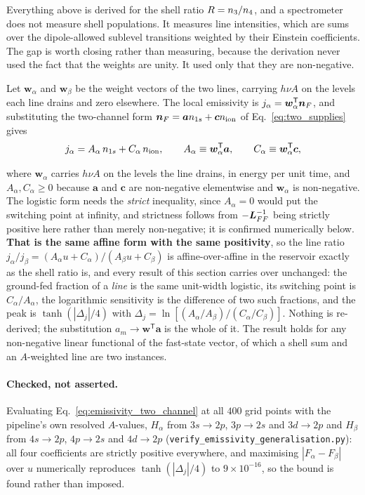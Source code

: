 Everything above is derived for the shell ratio $R = n_3/n_4$, and a
spectrometer does not measure shell populations. It measures line intensities,
which are sums over the dipole-allowed sublevel transitions weighted by their
Einstein coefficients. The gap is worth closing rather than measuring, because
the derivation never used the fact that the weights are unity. It used only
that they are non-negative.

Let $\bm{w}_\alpha$ and $\bm{w}_\beta$ be the weight vectors of the two lines,
carrying $h\nu A$ on the levels each line drains and zero elsewhere. The local
emissivity is $j_\alpha = \bm{w}_\alpha^{\mathsf T}\bm{n}_{F}$, and substituting the
two-channel form $\bm{n}_{F} = \bm{a}n_{1s} + \bm{c}n_{\mathrm{ion}}$ of
Eq.~\eqref{eq:two_supplies} gives
\begin{equation}
  j_\alpha = A_\alpha\,n_{1s} + C_\alpha\,n_{\mathrm{ion}} ,
  \qquad
  A_\alpha \equiv \bm{w}_\alpha^{\mathsf T}\bm{a},
  \qquad
  C_\alpha \equiv \bm{w}_\alpha^{\mathsf T}\bm{c} ,
  \label{eq:emissivity_two_channel}
\end{equation}

\noindent where $\bm{w}_\alpha$ carries $h\nu A$ on the levels the line drains,
in energy per unit time, and $A_\alpha, C_\alpha \ge 0$ because $\bm{a}$ and
$\bm{c}$ are non-negative elementwise and $\bm{w}_\alpha$ is non-negative. The
logistic form needs the \emph{strict} inequality, since $A_\alpha = 0$ would put
the switching point at infinity, and strictness follows from
$-\bm{L}_{FF}^{-1}$ being strictly positive here rather than merely
non-negative; it is confirmed numerically below.
\textbf{That is the same affine form with the same positivity},
so the line ratio
$j_\alpha/j_\beta = (A_\alpha u + C_\alpha)/(A_\beta u + C_\beta)$ is
affine-over-affine in the reservoir exactly as the shell ratio is, and every
result of this section carries over unchanged: the ground-fed fraction of a
\emph{line} is the same unit-width logistic, its switching point is
$C_\alpha/A_\alpha$, the logarithmic sensitivity is the difference of two such
fractions, and the peak is $\tanh(|\Delta_j|/4)$ with
$\Delta_j = \ln[(A_\alpha/A_\beta)/(C_\alpha/C_\beta)]$. Nothing is re-derived;
the substitution $a_m \to \bm{w}^{\mathsf T}\bm{a}$ is the whole of it. The
result holds for any non-negative linear functional of the fast-state vector,
of which a shell sum and an $A$-weighted line are two instances.

\paragraph{Checked, not asserted.} Evaluating
Eq.~\eqref{eq:emissivity_two_channel} at all $400$ grid points with the
pipeline's own resolved $A$-values, $H_\alpha$ from $3s\to2p$, $3p\to2s$ and
$3d\to2p$ and $H_\beta$ from $4s\to2p$, $4p\to2s$ and $4d\to2p$
(\texttt{verify\_emissivity\_generalisation.py}): all four coefficients are
strictly positive everywhere, and maximising $|F_\alpha - F_\beta|$ over $u$
numerically reproduces $\tanh(|\Delta_j|/4)$ to $9\times10^{-16}$, so the bound
is found rather than imposed.

